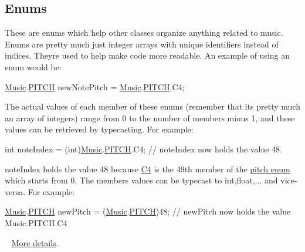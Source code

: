 \begin{DoxyParagraph}{}

\end{DoxyParagraph}
\hypertarget{group___music_group_DocMusicEnums}{}\subsection{Enums}\label{group___music_group_DocMusicEnums}
These are enums which help other classes organize anything related to music. Enums are pretty much just integer arrays with unique identifiers instead of indices. They\textquotesingle{}re used to help make code more readable. An example of using an enum would be\+:
\begin{DoxyCode}
\hyperlink{class_music}{Music}.\hyperlink{group___music_enums_ga508f69b199ea518f935486c990edac1d}{PITCH} newNotePitch = \hyperlink{class_music}{Music}.\hyperlink{group___music_enums_ga508f69b199ea518f935486c990edac1d}{PITCH}.C4; 
\end{DoxyCode}
 The actual values of each member of these enums (remember that it\textquotesingle{}s pretty much an array of integers) range from 0 to the number of members minus 1, and these values can be retrieved by typecasting. For example\+: 
\begin{DoxyCode}
\textcolor{keywordtype}{int} noteIndex = (int)\hyperlink{class_music}{Music}.\hyperlink{group___music_enums_ga508f69b199ea518f935486c990edac1d}{PITCH}.C4; \textcolor{comment}{// noteIndex now holds the value 48. }
\end{DoxyCode}
 note\+Index holds the value 48 because \hyperlink{group___music_enums_gga508f69b199ea518f935486c990edac1dab713e6323a68d3ddabf4855826c50148}{C4} is the 49th member of the \hyperlink{group___music_enums_ga508f69b199ea518f935486c990edac1d}{pitch enum} which starts from 0. The members values can be typecast to int,float,... and vice-\/versa. For example\+: 
\begin{DoxyCode}
\hyperlink{class_music}{Music}.\hyperlink{group___music_enums_ga508f69b199ea518f935486c990edac1d}{PITCH} newPitch = (\hyperlink{class_music}{Music}.\hyperlink{group___music_enums_ga508f69b199ea518f935486c990edac1d}{PITCH})48; \textcolor{comment}{// newPitch now holds the value Music.PITCH.C4 }
\end{DoxyCode}
 ~\newline
 \hyperlink{group___music_enums}{More details}.

